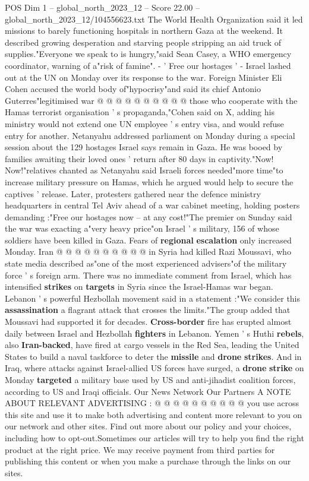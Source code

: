 \begin{textsample}{POS Dim 1 – global\_north\_2023\_12 – Score 22.00 – global\_north\_2023\_12/104556623.txt}
The World Health Organization said it led missions to barely functioning hospitals in northern Gaza at the weekend.
It described growing desperation and starving people stripping an aid truck of supplies."Everyone we speak to is hungry,"said Sean Casey, a WHO emergency coordinator, warning of a"risk of famine". - ' Free our hostages ' - Israel lashed out at the UN on Monday over its response to the war.
Foreign Minister Eli Cohen accused the world body of"hypocrisy"and said its chief Antonio Guterres"legitimised war @ @ @ @ @ @ @ @ @ @ those who cooperate with the Hamas terrorist organisation ' s propaganda,"Cohen said on X, adding his ministry would not extend one UN employee ' s entry visa, and would refuse entry for another.
Netanyahu addressed parliament on Monday during a special session about the 129 hostages Israel says remain in Gaza.
He was booed by families awaiting their loved ones ' return after 80 days in captivity."Now!
Now!"relatives chanted as Netanyahu said Israeli forces needed"more time"to increase military pressure on Hamas, which he argued would help to secure the captives ' release.
Later, protesters gathered near the defence ministry headquarters in central Tel Aviv ahead of a war cabinet meeting, holding posters demanding :"Free our hostages now -- at any cost!"The premier on Sunday said the war was exacting a"very heavy price"on Israel ' s military, 156 of whose soldiers have been killed in Gaza.
Fears of \textbf{regional} \textbf{escalation} only increased Monday.
Iran @ @ @ @ @ @ @ @ @ @ in Syria had killed Razi Moussavi, who state media described as"one of the most experienced advisers"of the military force ' s foreign arm.
There was no immediate comment from Israel, which has intensified \textbf{strikes} on \textbf{targets} in Syria since the Israel-Hamas war began.
Lebanon ' s powerful Hezbollah movement said in a statement :"We consider this \textbf{assassination} a flagrant attack that crosses the limits."The group added that Moussavi had supported it for decades. \textbf{Cross-border} fire has erupted almost daily between Israel and Hezbollah \textbf{fighters} in Lebanon.
Yemen ' s Huthi \textbf{rebels}, also \textbf{Iran-backed}, have fired at cargo vessels in the Red Sea, leading the United States to build a naval taskforce to deter the \textbf{missile} and \textbf{drone} \textbf{strikes}.
And in Iraq, where attacks against Israel-allied US forces have surged, a \textbf{drone} \textbf{strike} on Monday \textbf{targeted} a military base used by US and anti-jihadist coalition forces, according to US and Iraqi officials.
Our News Network Our Partners A NOTE ABOUT RELEVANT ADVERTISING : @ @ @ @ @ @ @ @ @ @ you use across this site and use it to make both advertising and content more relevant to you on our network and other sites.
Find out more about our policy and your choices, including how to opt-out.Sometimes our articles will try to help you find the right product at the right price.
We may receive payment from third parties for publishing this content or when you make a purchase through the links on our sites.


\end{textsample}

